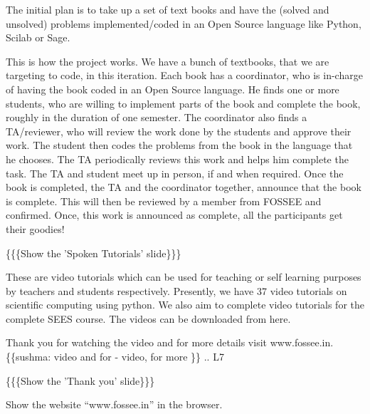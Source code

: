 \documentclass[a4paper,english]{article}
\begin{document}
The initial plan is to take up a set of text books and have the (solved and unsolved) problems implemented/coded in an Open Source language like Python, Scilab or Sage.

This is how the project works. We have a bunch of textbooks, that we are targeting to code, in this iteration. Each book has a coordinator, who is in-charge of having the book coded in an Open Source language. He finds one or more students, who are willing to implement parts of the book and complete the book, roughly in the duration of one semester. The coordinator also finds a TA/reviewer, who will review the work done by the students and approve their work. The student then codes the problems from the book in the language that he chooses. The TA periodically reviews this work and helps him complete the task. The TA and student meet up in person, if and when required. Once the book is completed, the TA and the coordinator together, announce that the book is complete. This will then be reviewed by a member from FOSSEE and confirmed. Once, this work is announced as complete, all the participants get their goodies!


\{\{\{Show the 'Spoken Tutorials' slide\}\}\}


These are video tutorials which can be used for teaching or self learning purposes by teachers and students respectively. Presently, we have 37 video tutorials on scientific computing using python. We also aim to complete video tutorials for the complete SEES course. The videos can be downloaded from here.

Thank you for watching the video and for more details visit www.fossee.in.
\{\{sushma: video and for - video, for more \}\}
.. L7

\{\{\{Show the 'Thank you' slide\}\}\}

Show the website ``www.fossee.in'' in the browser.
\end{document}
